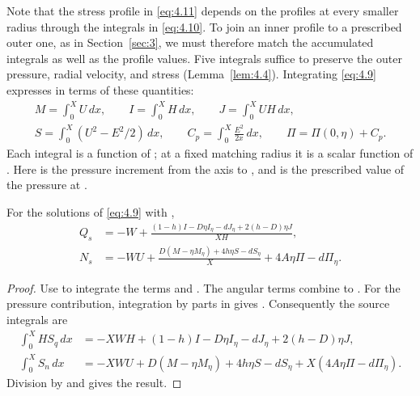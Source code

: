 Note that the stress profile  in
\eqref{eq:4.11} depends on the profiles  at every
smaller radius through the integrals in \eqref{eq:4.10}. To join an inner
profile to a prescribed outer one, as in Section~\ref{sec:3}, we must therefore
match the accumulated integrals as well as the profile values. Five integrals
suffice to preserve the outer pressure, radial velocity, and stress
(Lemma~\ref{lem:4.4}). Integrating \eqref{eq:4.9} expresses
 in terms of these quantities:
\begin{equation}
\begin{gathered}
 M=\int_0^X U\,dx,\qquad
 I=\int_0^X H\,dx,\qquad
 J=\int_0^X UH\,dx,\\
 S=\int_0^X(U^2-E^2/2)\,dx,\qquad
 C_p=\int_0^X\frac{E^2}{2x}\,dx,\qquad
 \Pi=\Pi(0,\eta)+C_p.
\end{gathered}
\tag{4.15}\label{eq:4.15}
\end{equation}
Each integral is a function of ; at a fixed
matching radius it is a scalar function of . Here
 is the pressure increment from the axis to
, and  is the
prescribed value of the pressure at .

\begin{lemma}\label{lem:4.3}
For the solutions of \eqref{eq:4.9} with
,
\begin{equation}
\begin{aligned}
 Q_s&=-W+\frac{(1-h)I-D\eta I_\eta-dJ_\eta+2(h-D)\eta J}{XH},\\
 N_s&=-WU+\frac{D(M-\eta M_\eta)+4h\eta S-dS_\eta}{X}
             +4A\eta\Pi-d\Pi_\eta.
\end{aligned}
\tag{4.16}\label{eq:4.16}
\end{equation}
\end{lemma}

\begin{proof}
Use  to integrate the
terms  and
. The angular terms
 combine to
. For the pressure contribution, integration
by parts in  gives
.
Consequently the source integrals are
\[
\begin{aligned}
 \int_0^XHS_q\,dx
   &=-XWH+(1-h)I-D\eta I_\eta-dJ_\eta+2(h-D)\eta J,\\
 \int_0^XS_n\,dx
   &=-XWU+D(M-\eta M_\eta)+4h\eta S-dS_\eta
      +X(4A\eta\Pi-d\Pi_\eta).
\end{aligned}
\]
Division by  and  gives the result.
\end{proof}

